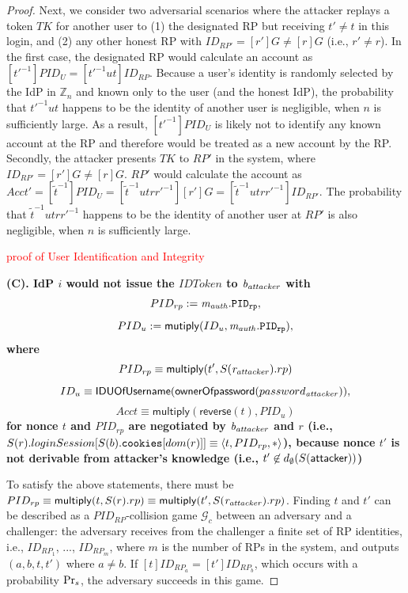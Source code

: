 \begin{proof}
Next, we consider two adversarial scenarios where the attacker replays a token $TK$ for another user to (1) the designated RP but receiving $t'\neq t$ in this login, and (2) any other honest RP with $ID_{RP'} = [r']G \neq [r]G$ (i.e., $r' \neq r$). In the first case, the designated RP would calculate an account as $[t'^{-1}]PID_U = [t'^{-1}ut]ID_{RP}$.
Because a user's identity is randomly selected by the IdP in $\mathbb{Z}_n$ and known only to the user (and the honest IdP), the probability that $t'^{-1}ut$ happens to be the identity of another user is negligible, when $n$ is sufficiently large. As a result, $[t'^{-1}]PID_U$ is likely not to identify any known account at the RP and therefore would be treated as a new account by the RP. 
Secondly, the attacker presents $TK$ to $RP'$ in the system, where $ID_{RP'} = [r']G \neq [r]G$. $RP'$ would calculate the account as $Acct' = [\tilde{t}^{-1}]PID_{U} = [\tilde{t}^{-1}utrr'^{-1}][r']G = [\tilde{t}^{-1}utrr'^{-1}]ID_{RP'}$. The probability that $\tilde{t}^{-1}utrr'^{-1}$ happens to be the identity of another user at $RP'$ is also negligible, when $n$ is sufficiently large. 

    
    \textcolor{red}{proof of User Identification and Integrity}
      
  
  
  \textbf{(C). IdP $i$ would not issue the $IDToken$ to $\mathit{b_{attacker}}$ with 
  $$PID_{rp} := \mathit{m_{auth}}.\mathtt{PID_{rp}} , $$
  $$PID_u := \mathsf{mutiply}(ID_u, \mathit{m_{auth}.\mathtt{PID_{rp}}}),$$
  where
  $$PID_{rp} \equiv \mathsf{multiply}(t', S(\mathit{r_{attacker}}).rp)$$
  $$ID_u \equiv \mathsf{IDUOfUsername} (\mathsf{ownerOfpassword}(password_{\mathit{attacker}})),$$
  $$Acct \equiv \mathsf{multiply}(\mathsf{reverse}(t), PID_u)$$
  for nonce $t$ and $PID_{rp}$ are negotiated by $\mathit{b_{attacker}}$ and $r$ (i.e., $S(r).loginSession[S(b).\mathtt{cookies}[dom(r)]] \equiv \langle t, PID_{rp}, *\rangle$), because nonce $t'$ is not derivable from attacker's knowledge (i.e., $t' \not \in  d_{\emptyset}(S(\mathsf{attacker}))$)}
  
	To satisfy the above statements, there must be $PID_{rp} \equiv \mathsf{multiply}(t, S(r).rp) \equiv \mathsf{multiply}(t', S(\mathit{r_{attacker}}).rp)$. Finding $t$ and $t'$ can be described as a $PID_{RP}$-collision game $\mathcal{G}_c$ between an adversary and a challenger: the adversary receives from the challenger a finite set of RP identities, i.e., $ID_{RP_1}$, ..., $ID_{RP_m}$, where $m$ is the number of RPs in the system, and outputs $(a, b, t, t')$ where $a \neq b$. If $[t]ID_{RP_a}=[t']ID_{RP_b}$, which occurs with a probability ${\rm Pr}_s$, the adversary succeeds in this game.


\end{proof}
